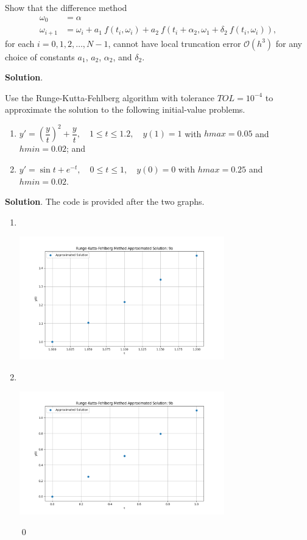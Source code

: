 \documentclass[11pt]{article}
\theoremstyle{break}
\numberwithin{equation}{theorem}
\begin{document}
\newpage
\begin{problem}\label{problem 8} %
    Show that the difference method 
    \begin{align*}
        \omega_0&=\alpha\\
        \omega_{i+1}&=\omega_i+a_1\:f(t_i, \omega_i)+a_2\:f(t_i+\alpha_2, \omega_1+\delta_2\:f(t_i, \omega_i)),
    \end{align*}
    for each $i=0,1,2,\dots, N-1$, cannot have local truncation error $\mathcal{O}(h^3)$ for any choice of constants $a_1$, $a_2$, $\alpha_2$, and $\delta_2$.
\end{problem}
\textbf{Solution}. 


\newpage
\begin{problem}\label{problem 9} %
    Use the Runge-Kutta-Fehlberg algorithm with tolerance $TOL = 10^{-4}$ to approximate the solution to the following initial-value problems.
    \begin{enumerate}
        \item $y'=\left(\dfrac{y}{t}\right)^2+\dfrac{y}{t}, \quad 1\leq t\leq 1.2, \quad y(1)=1$ with $hmax=0.05$ and $hmin=0.02$; and
        \item $y'=\sin t+e^{-t}, \quad 0\leq t\leq 1, \quad y(0)=0$ with $hmax=0.25$ and $hmin=0.02.$
    \end{enumerate}
\end{problem}
\textbf{Solution}. The code is provided after the two graphs.
\begin{enumerate}
    \item $\ $
    \begin{center}
        \includegraphics[width=0.7\textwidth]{P9a.png}
    \end{center}
    \item $\ $
    \begin{center}
        \includegraphics[width=0.7\textwidth]{P9b.png}
    \end{center} \qed
\end{enumerate}
\end{document}
